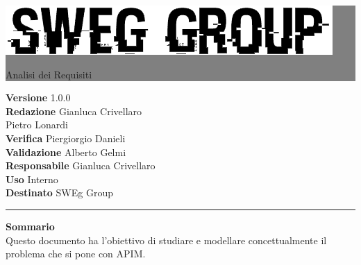 \documentclass[12pt,a4paper,titlepage]{article}
\newcommand{\HRule}[1]{\hfill \rule{0.2\linewidth}{#1}} %
\begin{document}
	
	\thispagestyle{empty} %
	
	
	\colorbox{grey}{
		\parbox[t]{1.0\linewidth}{
			\centering \fontsize{50pt}{80pt}\selectfont %
			\vspace*{0.7cm} %
			
			\raggedleft
			\includegraphics[width=0.7\linewidth]{../../LogoSWEgGroupSFONDOVUOTO}
			
			\hfill Analisi dei Requisiti \\
			
			\vspace*{0.7cm} %
		}
	}
	
	
	\vfill %
	
	
	{\centering \large 
		\hfill \textbf{Versione} 1.0.0 \\
		\hfill \textbf{Redazione} Gianluca Crivellaro \\
		\hfill  Pietro Lonardi\\
		\hfill \textbf{Verifica} Piergiorgio Danieli  \\
		\hfill \textbf{Validazione} Alberto Gelmi \\
		\hfill \textbf{Responsabile} Gianluca Crivellaro \\
		\hfill \textbf{Uso} Interno \\
		\hfill \textbf{Destinato} SWEg Group \\ 
		
		\HRule{1pt}
		
		\textbf{Sommario} \\
		Questo documento ha l'obiettivo di studiare e modellare concettualmente il problema che si pone con APIM.
		
	} %
	
\end{document}
